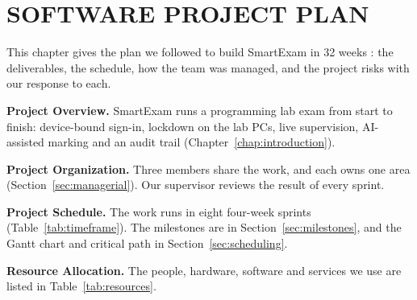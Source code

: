 \chapter{SOFTWARE PROJECT PLAN}
\label{chap:spp}

This chapter gives the plan we followed to build SmartExam in 32 weeks \cite{pmbok6}: the deliverables, the schedule, how the team was managed, and the project risks with our response to each.

\textbf{Project Overview.} SmartExam runs a programming lab exam from start to finish: device-bound sign-in, lockdown on the lab PCs, live supervision, AI-assisted marking and an audit trail (Chapter~\ref{chap:introduction}).

\textbf{Project Organization.} Three members share the work, and each owns one area (Section~\ref{sec:managerial}). Our supervisor reviews the result of every sprint.

\textbf{Project Schedule.} The work runs in eight four-week sprints (Table~\ref{tab:timeframe}). The milestones are in Section~\ref{sec:milestones}, and the Gantt chart and critical path in Section~\ref{sec:scheduling}.

\textbf{Resource Allocation.} The people, hardware, software and services we use are listed in Table~\ref{tab:resources}.
